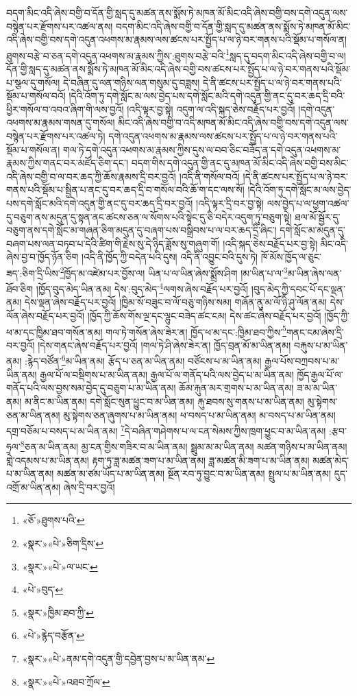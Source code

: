 བདག་མིང་འདི་ཞེས་བགྱི་བ་དོན་གྱི་སླད་དུ་མཚན་ནས་སྨོས་ཏེ་མཁན་མོ་མིང་འདི་ཞེས་བགྱི་བས་དགེ་འདུན་ལས་བསྙེན་པར་རྫོགས་པར་འཚལ་ནས། བདག་མིང་འདི་ཞེས་བགྱི་བ་དོན་གྱི་སླད་དུ་མཚན་ནས་སྨོས་ཏེ་མཁན་མོ་མིང་འདི་ཞེས་བགྱི་བས་དགེ་འདུན་འཕགས་མ་རྣམས་ལས་ཚངས་པར་སྤྱོད་པ་ལ་ཉེ་བར་གནས་པའི་སྡོམ་པ་གསོལ་ན། ཐུགས་བརྩེ་བ་ཅན་དགེ་འདུན་འཕགས་མ་རྣམས་ཀྱིས་:ཐུགས་བརྩེ་བའི་\footnote{«ཅོ་»ཐུགས་པའི་}སླད་དུ་བདག་མིང་འདི་ཞེས་བགྱི་བ་ལ། དོན་གྱི་སླད་དུ་མཚན་ནས་སྨོས་ཏེ་མཁན་མོ་མིང་འདི་ཞེས་བགྱི་བས་ཚངས་པར་སྤྱོད་པ་ལ་ཉེ་བར་གནས་པའི་སྡོམ་པ་སྩལ་དུ་གསོལ། དེ་བཞིན་དུ་ལན་གཉིས་ལན་གསུམ་དུ་བཟླས། དེ་ནི་ཚངས་པར་སྤྱོད་པ་ལ་ཉེ་བར་གནས་པའི་སྡོམ་པ་གསོལ་བའོ། །དེའི་འོག་ཏུ་དགེ་སློང་མ་ལས་བྱེད་པས་དགེ་སློང་མའི་དགེ་འདུན་གྱི་ནང་དུ་བར་ཆད་དྲི་བའི་ཕྱིར་གསོལ་བ་འབའ་ཞིག་གི་ལས་བྱའོ། །འདི་ལྟར་བྱ་སྟེ། འདུག་ལ་འདི་སྐད་ཅེས་བརྗོད་པར་བྱའོ། །དགེ་འདུན་འཕགས་མ་རྣམས་གསན་དུ་གསོལ། མིང་འདི་ཞེས་བགྱི་བ་འདི་མཁན་མོ་མིང་འདི་ཞེས་བགྱི་བས་དགེ་འདུན་ལས་བསྙེན་པར་རྫོགས་པར་འཚལ་ཏེ། དགེ་འདུན་འཕགས་མ་རྣམས་ལས་ཚངས་པར་སྤྱོད་པ་ལ་ཉེ་བར་གནས་པའི་སྡོམ་པ་གསོལ་ན། གལ་ཏེ་དགེ་འདུན་འཕགས་མ་རྣམས་ཀྱིས་དུས་ལ་བབ་ཅིང་བཟོད་ན་དགེ་འདུན་འཕགས་མ་རྣམས་ཀྱིས་གནང་བར་མཛོད་ཅིག་དང་། བདག་གིས་དགེ་འདུན་གྱི་ནང་དུ་མཁན་མོ་མིང་འདི་ཞེས་བགྱི་བས་མིང་འདི་ཞེས་བགྱི་བ་ལ་བར་ཆད་ཀྱི་ཆོས་རྣམས་དྲི་བར་བྱའོ། །འདི་ནི་གསོལ་བའོ། །དེ་ནི་ཚངས་པར་སྤྱོད་པ་ལ་ཉེ་བར་གནས་པའི་སྡོམ་པ་སྦྱིན་པ་ནང་དུ་བར་ཆད་དྲི་བ་གསོལ་བའི་ཆོ་ག་དང་ལས་སོ། །དེའི་འོག་ཏུ་དགེ་སློང་མ་ལས་བྱེད་པས་དགེ་སློང་མའི་དགེ་འདུན་གྱི་ནང་དུ་བར་ཆད་དྲི་བར་བྱའོ། །འདི་ལྟར་དྲི་བར་བྱ་སྟེ། ལས་བྱེད་པ་ལ་ཕྱག་འཚལ་དུ་བཅུག་ནས་མདུན་དུ་སྟན་ནང་ཚངས་ཅན་ལ་སོགས་པའི་སྟེང་དུ་ཅི་བདེར་འདུག་ཏུ་བཅུག་སྟེ། ཐལ་མོ་སྦྱོར་དུ་བཅུག་ནས་དགེ་སློང་མ་གཞན་ཅིག་མདུན་དུ་བཞག་པས་བསྒྲིབས་པ་ལ་བར་ཆད་དྲི་ཞིང་། དགེ་སློང་མ་མདུན་དུ་བཞག་པས་ལན་བཏབ་པ་དེའི་ཚིག་གི་རྗེས་སུ་དེ་ཉིད་ཟློས་སུ་གཞུག་གོ། །འདི་སྐད་ཅེས་བརྗོད་པར་བྱ་སྟེ། མིང་འདི་ཞེས་བྱ་བ་ཁྱོད་ཉོན་ཅིག །འདི་ནི་ཁྱོད་ཀྱི་བདེན་པའི་དུས། འདི་ནི་འབྱུང་བའི་དུས་ཏེ། ཁོ་མོས་ཁྱོད་ལ་ཅུང་ཟད་:ཅིག་དྲི་ཡིས་\footnote{«སྣར་»«པེ་»ཅིག་དྲིས་}ཁྱོད་མ་འཛེམ་པར་བྱོས་ལ། ཡིན་པ་ལ་ཡིན་ཞེས་སྨྲོས་ཤིག །མ་ཡིན་པ་ལ་\footnote{«སྣར་»«པེ་»ལ་ཡང་}མ་ཡིན་ཞེས་ལན་ཐོབ་ཅིག །ཁྱོད་བུད་མེད་ཡིན་ནམ། དེས་:བུད་མེད་\footnote{«པེ་»བུད་}ལགས་ཞེས་བརྗོད་པར་བྱའོ། །བུད་མེད་ཀྱི་དབང་པོ་དང་ལྡན་ནམ། དེས་ལྡན་ཞེས་བརྗོད་པར་བྱའོ། །ཁྱིམ་སོ་བཟུང་བ་ལོ་བཅུ་གཉིས་སམ། གཞོན་ནུ་མ་ལོ་ཉི་ཤུ་ལོན་ནམ། དེས་ལོན་ཞེས་བརྗོད་པར་བྱའོ། །ཁྱོད་ཀྱི་ཆོས་གོས་ལྔ་དང་ལྷུང་བཟེད་ཚང་ངམ། དེས་ཚང་ཞེས་བརྗོད་པར་བྱའོ། །ཁྱོད་ཀྱི་ཕ་མ་དང་ཁྱིམ་ཐབ་གསོན་ནམ། གལ་ཏེ་གསོན་ཞེས་ཟེར་ན། ཁྱོད་ཕ་མ་དང་:ཁྱིམ་ཐབ་ཀྱིས་\footnote{«སྣར་»ཁྱིམ་ཐབ་ཀྱི་}གནང་ངམ་ཞེས་དྲི་བར་བྱའོ། །དེས་གནང་ཞེས་བརྗོད་པར་བྱའོ། །གལ་ཏེ་ཤི་ཞེས་ཟེར་ན། ཁྱོད་བྲན་མོ་མ་ཡིན་ནམ། བརྐུས་པ་མ་ཡིན་ནམ། :རྙེད་བཙོན་\footnote{«པེ་»རྙེད་བརྩོན་}མ་ཡིན་ནམ། རྩོད་པ་ཅན་མ་ཡིན་ནམ། བཙོངས་པ་མ་ཡིན་ནམ། རྒྱལ་པོས་བཀྲབས་པ་མ་ཡིན་ནམ། རྒྱལ་པོ་ལ་བསྡིགས་པ་མ་ཡིན་ནམ། རྒྱལ་པོ་ལ་གནོད་པའི་ལས་བྱེད་པ་མ་ཡིན་ནམ། ཁྱོད་རྒྱལ་པོ་ལ་གནོད་པའི་ལས་བྱས་སམ་བྱེད་དུ་བཅུག་པ་མ་ཡིན་ནམ། ཆོམ་རྐུན་མར་གྲགས་པ་མ་ཡིན་ནམ། ཟ་མ་མ་ཡིན་ནམ། མ་ནིང་མ་ཡིན་ནམ། དགེ་སློང་སུན་ཕྱུང་བ་མ་ཡིན་ནམ། རྐུ་ཐབས་སུ་གནས་པ་མ་ཡིན་ནམ། མུ་སྟེགས་ཅན་མ་ཡིན་ནམ། མུ་སྟེགས་ཅན་ཞུགས་པ་མ་ཡིན་ནམ། ཕ་བསད་པ་མ་ཡིན་ནམ། མ་བསད་པ་མ་ཡིན་ནམ། དགྲ་བཅོམ་པ་བསད་པ་མ་ཡིན་ནམ། \footnote{«སྣར་»«པེ་»ནམ་དགེ་འདུན་གྱི་དབྱེན་བྱས་པ་མ་ཡིན་ནམ་}དེ་བཞིན་གཤེགས་པ་ལ་ངན་སེམས་ཀྱིས་ཁྲག་ཕྱུང་བ་མ་ཡིན་ནམ། :རྩབ་ཧྲལ་\footnote{«སྣར་»«པེ་»འཐབ་ཀྲོལ་}ཅན་མ་ཡིན་ནམ། མྱ་ངན་གྱིས་གཟིར་བ་མ་ཡིན་ནམ། སྦྲུམ་མ་མ་ཡིན་ནམ། མཚན་གཉིས་པ་མ་ཡིན་ནམ། གླེ་འདམས་པ་མ་ཡིན་ནམ། རྟག་ཏུ་ཟླ་མཚན་ཟག་པ་མ་ཡིན་ནམ། ཟླ་མཚན་མི་ཟག་པ་མ་ཡིན་ནམ། མཚན་མེད་པ་མ་ཡིན་ནམ། མཚན་མ་ཙམ་ཡོད་པ་མ་ཡིན་ནམ། སྔོན་རབ་ཏུ་བྱུང་བ་མ་ཡིན་ནམ། སྤྲུལ་པ་མ་ཡིན་ནམ། དུད་འགྲོ་མ་ཡིན་ནམ། ཞེས་དྲི་བར་བྱའོ། 